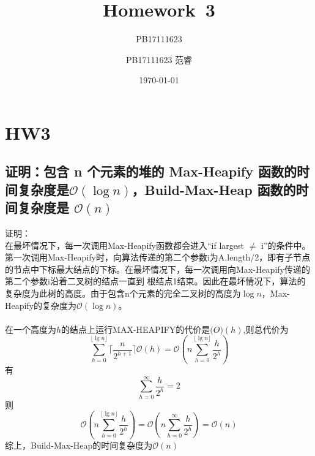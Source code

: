 \documentclass[UTF8]{ctexart}
\title{Homework\ 3}
\author{PB17111623}
\author{PB17111623 范睿}
\date{\today}
\begin{document}
\maketitle
\section{HW3}
\subsection{证明：包含 n 个元素的堆的 Max-Heapify 函数的时间复杂度是$\mathcal{O}(\log n)$，Build-Max-Heap 函数的时间复杂度是 $\mathcal{O}(n)$}
证明：\\
在最坏情况下，每一次调用Max-Heapify函数都会进入“if largest $\neq$ i”的条件中。第一次调用Max-Heapify时，向算法传递的第二个参数i为A.length/2，即有子节点的节点中下标最大结点的下标。在最坏情况下，每一次调用向Max-Heapify传递的第二个参数i沿着二叉树的结点一直到 根结点1结束。因此在最坏情况下，算法的复杂度为此树的高度。由于包含n个元素的完全二叉树的高度为$\log n$，Max-Heapify的复杂度为$\mathcal{O}(\log n)$。
\\\\在一个高度为$h$的结点上运行MAX-HEAPIFY的代价是$\mathcal(O)(h)$,则总代价为\\
\begin{equation*}
\sum_{h=0}^{\lfloor \lg n\rfloor}\lceil \frac{n}{2^{h+1}}\rceil \mathcal O(h) = \mathcal O(n \sum_{h=0}^{\lfloor \lg n \rfloor}\frac{h}{2^h})
\end{equation*}
有\\
\begin{equation*}
\sum_{h=0}^\infty \frac{h}{2^h}=2
\end{equation*}
则
\begin{equation*}
\mathcal O(n \sum_{h=0}^{\lfloor \lg n \rfloor}\frac{h}{2^h}) = \mathcal O(n \sum_{h=0}^{\infty}\frac{h}{2^h})=\mathcal O(n)
\end{equation*}
综上，Build-Max-Heap的时间复杂度为$\mathcal O(n)$
\end{document}
